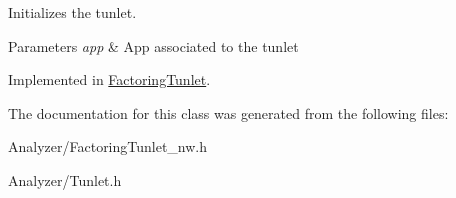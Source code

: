 Initializes the tunlet. 


\begin{DoxyParams}{Parameters}
{\em app} & App associated to the tunlet \\
\hline
\end{DoxyParams}


Implemented in \hyperlink{class_factoring_tunlet_a4883ba0a05903fb09b9f420d72927d86}{Factoring\-Tunlet}.



The documentation for this class was generated from the following files\-:\begin{DoxyCompactItemize}
\item 
Analyzer/Factoring\-Tunlet\-\_\-nw.\-h\item 
Analyzer/Tunlet.\-h\end{DoxyCompactItemize}
